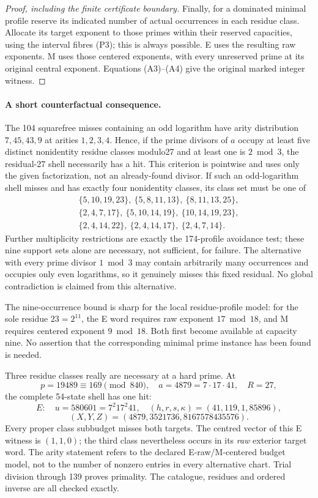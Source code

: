 \begin{proof}[Proof, including the finite certificate boundary]
Finally, for a dominated minimal profile reserve its indicated number of
actual occurrences in each residue class. Allocate its target exponent to
those primes within their reserved capacities, using the interval fibres
(P3); this is always possible. E uses the resulting raw exponents. M uses
those centered exponents, with every unreserved prime at its original central
exponent. Equations (A3)--(A4) give the original marked integer witness.
\end{proof}

\paragraph{A short counterfactual consequence.}
The 104 squarefree misses containing an odd logarithm have arity distribution
$7,45,43,9$ at arities $1,2,3,4$. Hence, if the prime divisors of $a$ occupy
at least five distinct nonidentity residue classes modulo27 and at least one
is $2\bmod3$, the residual-27 shell necessarily has a hit. This criterion is
pointwise and uses only the given factorization, not an already-found divisor.
If such an odd-logarithm shell misses and has exactly four nonidentity classes,
its class set must be one of
\[
\begin{gathered}
 \{5,10,19,23\},\ \{5,8,11,13\},\ \{8,11,13,25\},\\
 \{2,4,7,17\},\ \{5,10,14,19\},\ \{10,14,19,23\},\\
 \{2,4,14,22\},\ \{2,4,14,17\},\ \{2,4,7,14\}.
\end{gathered}
\]
Further multiplicity restrictions are exactly the 174-profile avoidance test;
these nine support sets alone are necessary, not sufficient, for failure.
The alternative with every prime divisor $1\bmod3$ may contain arbitrarily
many occurrences and occupies only even logarithms, so it genuinely misses
this fixed residual. No global contradiction is claimed from this alternative.

The nine-occurrence bound is sharp for the local residue-profile model:
for the sole residue $23=2^{11}$, the E word requires raw exponent
$17\bmod18$, and M requires centered exponent $9\bmod18$.
Both first become available at capacity nine. No assertion that the
corresponding minimal prime instance has been found is needed.

Three residue classes really are necessary at a hard prime. At
\[
 p=19489\equiv169\pmod{840},\quad a=4879=7\cdot17\cdot41,\quad R=27,
\]
the complete 54-state shell has one hit:
\[
 E:\quad u=580601=7^2 17^2 41,\quad
 (h,r,s,\kappa)=(41,119,1,85896),
\]
\[
 (X,Y,Z)=(4879,3521736,8167578435576).
 \tag{C3}
\]
Every proper class subbudget misses both targets. The centred vector of this
E witness is $(1,1,0)$; the third class nevertheless occurs in its \emph{raw}
exterior target word. The arity statement refers to the declared E-raw/M-centered
budget model, not to the number of nonzero entries in every alternative chart.
Trial division through 139 proves primality. The catalogue, residues and
ordered inverse are all checked exactly.

